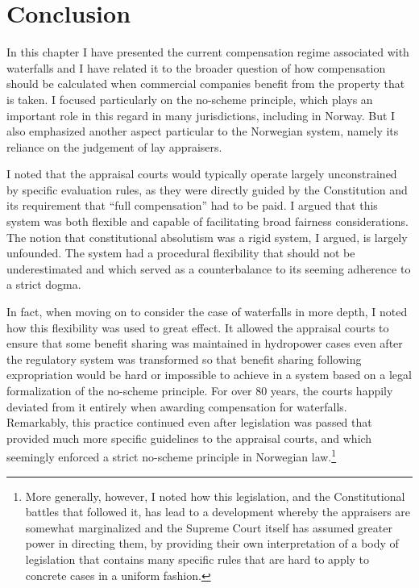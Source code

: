 \section{Conclusion}

In this chapter I have presented the current compensation regime associated with waterfalls and I have related it to the broader question of how compensation should be calculated when commercial companies benefit from the property that is taken. I focused particularly on the no-scheme principle, which plays an important role in this regard in many jurisdictions, including in Norway. But I also emphasized another aspect particular to the Norwegian system, namely its reliance on the judgement of lay appraisers. 

I noted that the appraisal courts would typically operate largely unconstrained by specific evaluation rules, as they were directly guided by the Constitution and its requirement that ``full compensation'' had to be paid. I argued that this system was both flexible and capable of facilitating broad fairness considerations. The notion that constitutional absolutism was a rigid system, I argued, is largely unfounded. The system had a procedural flexibility that should not be underestimated and which served as a counterbalance to its seeming adherence to a strict dogma.

In fact, when moving on to consider the case of waterfalls in more depth, I noted how this flexibility was used to great effect. It allowed the appraisal courts to ensure that some benefit sharing was maintained in hydropower cases even after the regulatory system was transformed so that benefit sharing following expropriation would be hard or impossible to achieve in a system based on a legal formalization of the no-scheme principle. For over 80 years, the courts happily deviated from it entirely when awarding compensation for waterfalls. Remarkably, this practice continued even after legislation was passed that provided much more specific guidelines to the appraisal courts, and which seemingly enforced a strict no-scheme principle in Norwegian law.\footnote{More generally, however, I noted how this legislation, and the Constitutional battles that followed it, has lead to a development whereby the appraisers are somewhat marginalized and the Supreme Court itself has assumed greater power in directing them, by providing their own interpretation of a body of legislation that contains many specific rules that are hard to apply to concrete cases in a uniform fashion.}

